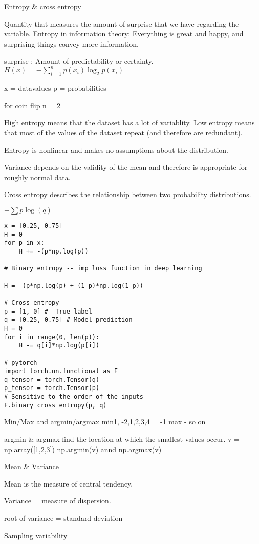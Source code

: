 \documentclass[30pt, a4]{article}
\begin{document}
Entropy \& cross entropy

Quantity that measures the amount of surprise that we have regarding the variable.
Entropy in information theory: Everything is great and happy, and surprising
things convey more information.

surprise : Amount of predictability or certainty.
$ H(x) = -\sum \limits_{i=1}^n p(x_i) \log_2 p(x_i)$

x = datavalues
p = probabilities

for coin flip n = 2

High entropy means that the dataset has a lot of variablity. Low entropy means
that most of the values of the dataset repeat (and therefore are redundant).

Entropy is nonlinear and makes no assumptions about the distribution.

Variance depends on the validity of the mean and therefore is appropriate for 
roughly normal data.

Cross entropy describes the relationship between two probability distributions.

$-\sum p \log (q)$

\begin{lstlisting}
x = [0.25, 0.75]
H = 0
for p in x: 
    H += -(p*np.log(p))

# Binary entropy -- imp loss function in deep learning

H = -(p*np.log(p) + (1-p)*np.log(1-p))

# Cross entropy
p = [1, 0] #  True label
q = [0.25, 0.75] # Model prediction
H = 0
for i in range(0, len(p)):
    H -= q[i]*np.log(p[i])

# pytorch
import torch.nn.functional as F
q_tensor = torch.Tensor(q)
p_tensor = torch.Tensor(p)
# Sensitive to the order of the inputs
F.binary_cross_entropy(p, q)
\end{lstlisting}

Min/Max and argmin/argmax
min{1, -2,1,2,3,4} = -1
max - so on 

argmin \& argmax find the location at which the smallest values occur. 
v = np.array([1,2,3])
np.argmin(v) annd np.argmax(v)

Mean \& Variance

Mean is the measure of central tendency. 

Variance = measure of dispersion.

root of variance = standard deviation

Sampling variability
\end{document}
